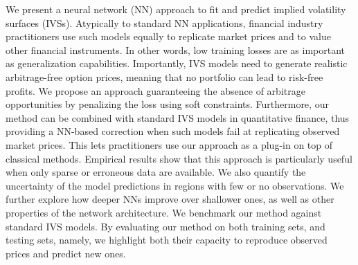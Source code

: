 We present a neural network (NN) approach to fit and predict implied volatility surfaces (IVSs).
Atypically to standard NN applications, financial industry practitioners use such models equally to replicate market prices and to value other financial instruments.
In other words, low training losses are as important as generalization capabilities.
Importantly, IVS models need to generate realistic arbitrage-free option prices, meaning that no portfolio can lead to risk-free profits.
We propose an approach guaranteeing the absence of arbitrage opportunities by penalizing the loss using soft constraints.
Furthermore, our method can be combined with standard IVS models in quantitative finance, thus providing a NN-based correction when such models fail at replicating observed market prices.
This lets practitioners use our approach as a plug-in on top of classical methods.
Empirical results show that this approach is particularly useful when only sparse or erroneous data are available.
We also quantify the uncertainty of the model predictions in regions with few or no observations.
We further explore how deeper NNs improve over shallower ones, as well as other properties of the network architecture.
We benchmark our method against standard IVS models.
By evaluating our method on both training sets, and testing sets, namely, we highlight both their capacity to reproduce observed prices and predict new ones.

